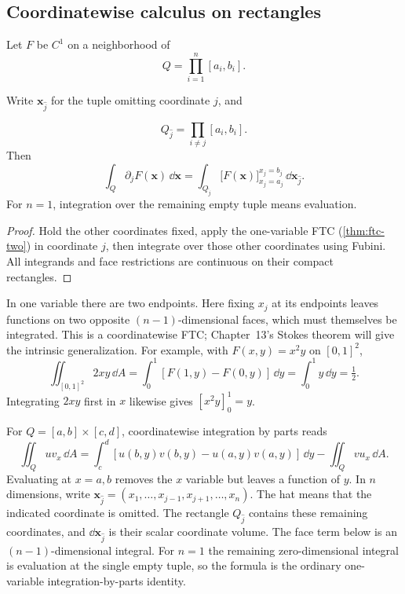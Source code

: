 \subsection{Coordinatewise calculus on rectangles}
\begin{corollary}\label{cor:coordinatewise-ftc}
Let $F$ be $C^1$ on a neighborhood of
\[
Q=\prod_{i=1}^n[a_i,b_i].
\]

Write $\mathbf{x}_{\widehat j}$ for the tuple omitting coordinate $j$, and

\[
Q_{\widehat j}=\prod_{i\ne j}[a_i,b_i].
\]
 Then
\[
\int_Q\partial_jF(\mathbf{x})\,\dd\mathbf{x}
=\int_{Q_{\widehat j}}\bigl[F(\mathbf{x})\bigr]_{x_j=a_j}^{x_j=b_j}\,\dd\mathbf{x}_{\widehat j}.
\]
For $n=1$, integration over the remaining empty tuple means evaluation.
\end{corollary}
\begin{proof}
Hold the other coordinates fixed, apply the one-variable FTC (\cref{thm:ftc-two}) in coordinate
$j$, then integrate over those other coordinates using Fubini. All
integrands and face restrictions are continuous on their compact rectangles.
\end{proof}
In one variable there are two endpoints. Here fixing $x_j$ at its endpoints
leaves functions on two opposite $(n-1)$-dimensional faces, which must
themselves be integrated. This is a coordinatewise FTC; Chapter~13's
Stokes theorem will give the intrinsic generalization.
For example, with $F(x,y)=x^2y$ on $[0,1]^2$,
\[
\iint_{[0,1]^2}2xy\,\dd A
=\int_0^1[F(1,y)-F(0,y)]\,\dd y
=\int_0^1y\,\dd y=\tfrac12.
\]
Integrating $2xy$ first in $x$ likewise gives $[x^2y]_0^1=y$.

For $Q=[a,b]\times[c,d]$, coordinatewise integration by parts reads
\[
\iint_Q u v_x\,\dd A
=\int_c^d [u(b,y)v(b,y)-u(a,y)v(a,y)]\,\dd y
-\iint_Q v u_x\,\dd A.
\]
Evaluating at $x=a,b$ removes the $x$ variable but leaves a function of $y$.
In $n$ dimensions, write
$\mathbf{x}_{\widehat j}=(x_1,\ldots,x_{j-1},x_{j+1},\ldots,x_n)$.
The hat means that the indicated coordinate is omitted.
The rectangle $Q_{\widehat j}$ contains these remaining coordinates, and
$\dd\mathbf{x}_{\widehat j}$ is their scalar coordinate volume. The face term
below is an $(n-1)$-dimensional integral. For $n=1$ the remaining
zero-dimensional integral is evaluation at the single empty tuple, so
the formula is the ordinary one-variable integration-by-parts identity.

